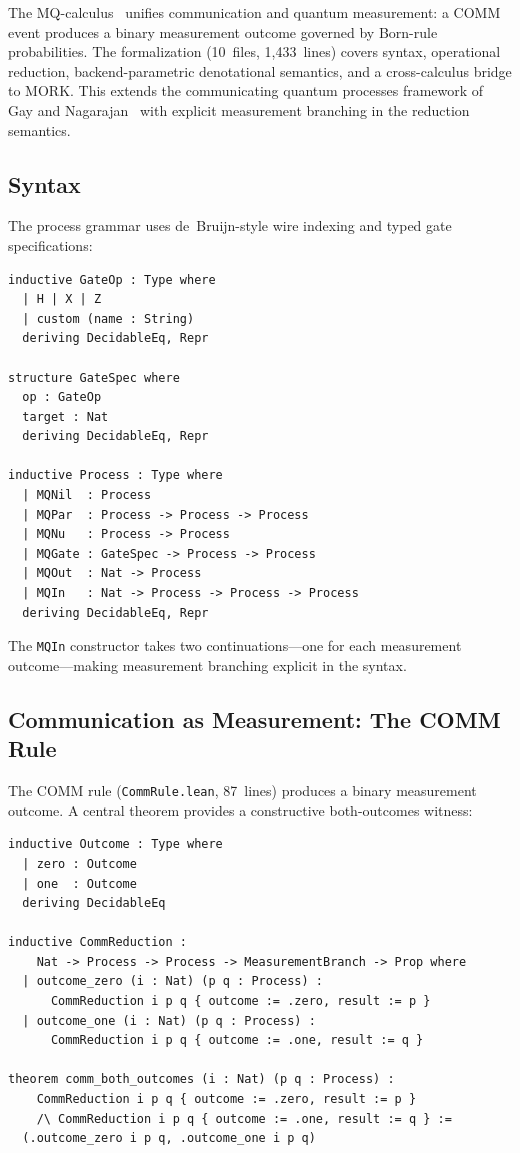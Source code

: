 \documentclass[11pt]{article}
\theoremstyle{definition}
\theoremstyle{remark}
\begin{document}
The MQ-calculus~\cite{StayMeredithMQ2026} unifies communication and
quantum measurement: a COMM event produces a binary measurement outcome
governed by Born-rule probabilities.  The formalization
(10~files, 1{,}433~lines) covers syntax, operational reduction,
backend-parametric denotational semantics, and a cross-calculus bridge
to MORK.
This extends the communicating quantum processes
framework of Gay and Nagarajan~\cite{GayNagarajan2005} with explicit
measurement branching in the reduction semantics.

\subsection{Syntax}

The process grammar uses de~Bruijn-style wire indexing and typed gate
specifications:

\begin{lstlisting}[caption={MQ-calculus process syntax (from \texttt{Syntax.lean})}]
inductive GateOp : Type where
  | H | X | Z
  | custom (name : String)
  deriving DecidableEq, Repr

structure GateSpec where
  op : GateOp
  target : Nat
  deriving DecidableEq, Repr

inductive Process : Type where
  | MQNil  : Process
  | MQPar  : Process -> Process -> Process
  | MQNu   : Process -> Process
  | MQGate : GateSpec -> Process -> Process
  | MQOut  : Nat -> Process
  | MQIn   : Nat -> Process -> Process -> Process
  deriving DecidableEq, Repr
\end{lstlisting}

\noindent
The \texttt{MQIn} constructor takes two continuations---one for each
measurement outcome---making measurement branching explicit in the
syntax.

\subsection{Communication as Measurement: The COMM Rule}

The COMM rule (\texttt{CommRule.lean}, 87~lines) produces a binary
measurement outcome.  A central theorem provides a constructive
both-outcomes witness:

\begin{lstlisting}[caption={COMM rule with constructive both-branches (from \texttt{CommRule.lean})}]
inductive Outcome : Type where
  | zero : Outcome
  | one  : Outcome
  deriving DecidableEq

inductive CommReduction :
    Nat -> Process -> Process -> MeasurementBranch -> Prop where
  | outcome_zero (i : Nat) (p q : Process) :
      CommReduction i p q { outcome := .zero, result := p }
  | outcome_one (i : Nat) (p q : Process) :
      CommReduction i p q { outcome := .one, result := q }

theorem comm_both_outcomes (i : Nat) (p q : Process) :
    CommReduction i p q { outcome := .zero, result := p }
    /\ CommReduction i p q { outcome := .one, result := q } :=
  (.outcome_zero i p q, .outcome_one i p q)
\end{lstlisting}
\end{document}
